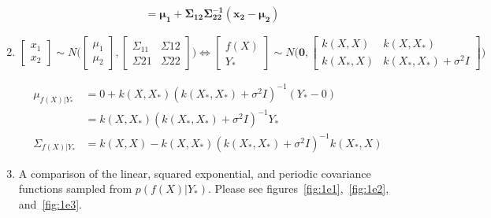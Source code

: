 \documentclass{article}
\begin{document}
\begin{enumerate}[label=(\alph*)]
\begin{align*}
&\bm{=\mu_1+\Sigma_{12}\Sigma_{22}^{-1}(x_2-\mu_2)}
\end{align*}
\item %
\[
\begin{bmatrix}
  x_1 \\ x_2
\end{bmatrix}
\sim{}N \Bigg(
\begin{bmatrix}
  \mu_1 \\ \mu_2
\end{bmatrix}
,
\begin{bmatrix}
  \Sigma_{11} & \Sigma{12} \\ \Sigma{21} & \Sigma{22}
\end{bmatrix}
\Bigg)
\Longleftrightarrow
\begin{bmatrix}
 f(X) \\ Y_\ast
\end{bmatrix}
\sim{}N \Bigg(
  \bm{0},
\begin{bmatrix}
  k(X,X) & k(X,X_\ast) \\ k(X_\ast,X) & k(X_\ast,X_\ast)+\sigma^2I
\end{bmatrix}
\Bigg)
\]

\begin{align*}
\mu_{f(X)|Y_\ast}&=0+k(X,X_\ast)(k(X_\ast,X_\ast)+\sigma^2I)^{-1}(Y_\ast-0) \\
&=k(X,X_\ast)(k(X_\ast,X_\ast)+\sigma^2I)^{-1}Y_\ast \\
\Sigma_{f(X)|Y_\ast}&=k(X,X)-k(X,X_\ast)(k(X_\ast,X_\ast)+\sigma^2I)^{-1}k(X_\ast,X)
\end{align*}

\item A comparison of the linear, squared exponential, and periodic covariance functions sampled from $p(f(X)|Y_\ast)$.
Please see figures~\ref{fig:1e1},~\ref{fig:1e2}, and~\ref{fig:1e3}.


\end{enumerate}
\end{document}
